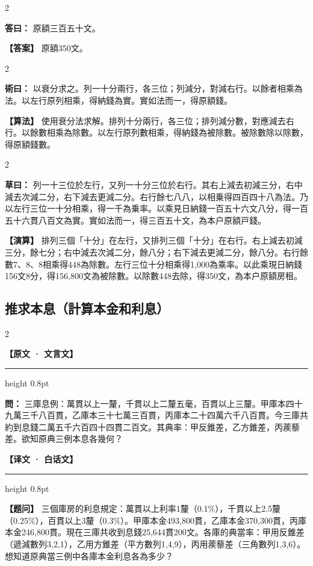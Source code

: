 \documentclass[11pt,a4paper]{article}
\newcommand{\ClassicalQuestion}[1]{\par\noindent\textbf{\color{problemcolor}問：}#1\par}
\newcommand{\ClassicalAnswer}[1]{\par\noindent\textbf{\color{answercolor}答曰：}#1\par}
\newcommand{\ClassicalMethod}[1]{\par\noindent\textbf{\color{methodcolor}術曰：}#1\par}
\newcommand{\ClassicalWorking}[1]{\par\noindent\textbf{草曰：}#1\par}
\newcommand{\ModernQuestion}[1]{\par\noindent\textbf{\color{modernlabel}【题问】}#1\par}
\newcommand{\ModernAnswer}[1]{\par\noindent\textbf{\color{answercolor}【答案】}#1\par}
\newcommand{\ModernMethod}[1]{\par\noindent\textbf{\color{methodcolor}【算法】}#1\par}
\newcommand{\ModernWorking}[1]{\par\noindent\textbf{【演算】}#1\par}
\newcommand{\ClassicalHeader}{%
  \begin{center}\textbf{\color{headerclassical}【原文 · 文言文】}\end{center}
  \vspace{-0.5em}
  \hrule height 0.8pt
  \vspace{0.5em}
}
\newcommand{\ModernHeader}{%
  \begin{center}\textbf{\color{headermodern}【译文 · 白话文】}\end{center}
  \vspace{-0.5em}
  \hrule height 0.8pt
  \vspace{0.5em}
}
\begin{document}
\begin{paracol}{2}

\ClassicalAnswer{%
原額三百五十文。}

\switchcolumn

\ModernAnswer{%
原額350文。
}

\end{paracol}

\begin{paracol}{2}

\ClassicalMethod{%
以衰分求之。列一十分兩行，各三位；列減分，對減右行。以餘者相乘為法。以左行原列相乘，得納錢為實。實如法而一，得原額錢。}

\switchcolumn

\ModernMethod{%
使用衰分法求解。排列十分兩行，各三位；排列減分數，對應減去右行。以餘數相乘為除數。以左行原列數相乘，得納錢為被除數。被除數除以除數，得原額錢數。
}

\end{paracol}

\begin{paracol}{2}

\ClassicalWorking{%
列一十三位於左行，又列一十分三位於右行。其右上減去初減三分，右中減去次減二分，右下減去更減二分。右行餘七八八，以相乗得四百四十八為法。乃以左行三位一十分相乘，得一千為乗率。以乘見日納錢一百五十六文八分，得一百五十六貫八百文為實。實如法而一，得三百五十文，為本户原額戸錢。}

\switchcolumn

\ModernWorking{%
排列三個「十分」在左行，又排列三個「十分」在右行。右上減去初減三分，餘七分；右中減去次減二分，餘八分；右下減去更減二分，餘八分。右行餘數7、8、8相乘得448為除數。左行三位十分相乘得1,000為乘率。以此乘現日納錢156文8分，得156,800文為被除數。以除數448去除，得350文，為本户原額房租。
}

\end{paracol}

\subsection*{\color{sectioncolor}推求本息（計算本金和利息）}

\begin{paracol}{2}

\ClassicalHeader

\ClassicalQuestion{%
三庫息例：萬貫以上一釐，千貫以上二釐五毫，百貫以上三釐。甲庫本四十九萬三千八百貫，乙庫本三十七萬三百貫，丙庫本二十四萬六千八百貫。今三庫共約到息錢二萬五千六百四十四貫二百文。其典率：甲反錐差，乙方錐差，丙蒺藜差。欲知原典三例本息各幾何？}

\switchcolumn

\ModernHeader

\ModernQuestion{%
三個庫房的利息規定：萬貫以上利率1釐（0.1\%），千貫以上2.5釐（0.25\%），百貫以上3釐（0.3\%）。甲庫本金493,800貫，乙庫本金370,300貫，丙庫本金246,800貫。現在三庫共收到息錢25,644貫200文。各庫的典當率：甲用反錐差（遞減數列3,2,1），乙用方錐差（平方數列1,4,9），丙用蒺藜差（三角數列1,3,6）。想知道原典當三例中各庫本金利息各為多少？
}

\end{paracol}
\end{document}
